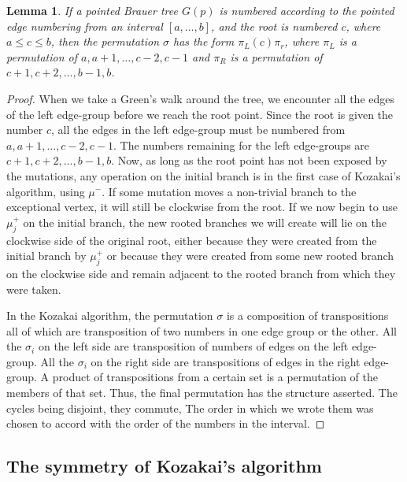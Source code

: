 \documentclass[11pt,english]{article}
\numberwithin{figure}{section}
\numberwithin{equation}{section}
\numberwithin{table}{section}
\newtheorem{lem}{Lemma}[section]
\theoremstyle{definition}
\theoremstyle{remark}
\begin{document}
\begin{lem}\label{split}
	If a pointed Brauer tree $G(p)$ is numbered according to the pointed edge numbering 
	from an interval $[a,\dots,b]$, and the root is numbered $c$, where $a \leq c \leq b$, then the permutation
	$\sigma$ has the form $\pi_L(c)\pi_r$, where $\pi_L$ is a permutation of 
	$a,a+1,\dots,c-2,c-1$ and $\pi_R$ is a permutation of $c+1,c+2,\dots, b-1,b$.
\end{lem}

\begin{proof}
	When we take a Green's walk around the tree, we encounter all the edges of the left edge-group before we reach the root point.  Since the root is given the number $c$, all the edges in the left edge-group must be numbered from $a,a+1,\dots, c-2,c-1$.
	The numbers remaining for the left edge-groups are $c+1,c+2,\dots,b-1,b$. Now, as long as the root point has not been exposed by the mutations, any operation on the initial branch is in the first case of Kozakai's algorithm, using $\mu^-$. If some mutation moves a non-trivial branch to the exceptional vertex, it will still be  clockwise from the root.  If we now begin to use $\mu_j^+$ on the initial branch, the new rooted branches we will create will lie on the clockwise side of the original root, either because they were created from the initial branch by $\mu_j^+$ or because they were created from some new rooted branch on the clockwise side and remain adjacent to the rooted branch from which they were taken.
	
	
	  In the Kozakai algorithm, the permutation $\sigma$ is a composition of transpositions all of which are transposition of two numbers in one edge group or the other. All the $\sigma_i$ on the left side are transposition of numbers of edges on the left edge-group.  All the $\sigma_i$ on the right side are transpositions of edges in the right edge-group.
	A product of transpositions from a certain set is a permutation of the members of that set. Thus, the final permutation has the structure asserted.  The cycles being disjoint, they commute, The order in which we wrote them was chosen to accord with the order of the numbers in the interval.
\end{proof}



\subsection{ The symmetry of Kozakai's algorithm}
\end{document}
